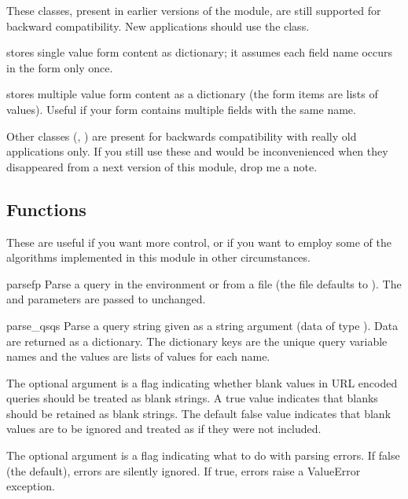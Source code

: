 These classes, present in earlier versions of the  module,
are still supported for backward compatibility.  New applications
should use the  class.

 stores single value form content as
dictionary; it assumes each field name occurs in the form only once.

 stores multiple value form content as a
dictionary (the form items are lists of values).  Useful if your form
contains multiple fields with the same name.

Other classes (, ) are
present for backwards compatibility with really old applications only.
If you still use these and would be inconvenienced when they
disappeared from a next version of this module, drop me a note.


\subsection{Functions}

These are useful if you want more control, or if you want to employ
some of the algorithms implemented in this module in other
circumstances.

\begin{funcdesc}{parse}{fp}
  Parse a query in the environment or from a file (the file defaults
  to ).  The  and
   parameters are passed to 
  unchanged.
\end{funcdesc}

\begin{funcdesc}{parse_qs}{qs}
Parse a query string given as a string argument (data of type 
).  Data are
returned as a dictionary.  The dictionary keys are the unique query
variable names and the values are lists of values for each name.

The optional argument  is
a flag indicating whether blank values in
URL encoded queries should be treated as blank strings.  
A true value indicates that blanks should be retained as 
blank strings.  The default false value indicates that
blank values are to be ignored and treated as if they were
not included.

The optional argument  is a flag indicating what
to do with parsing errors.  If false (the default), errors
are silently ignored.  If true, errors raise a ValueError
exception.
\end{funcdesc}

